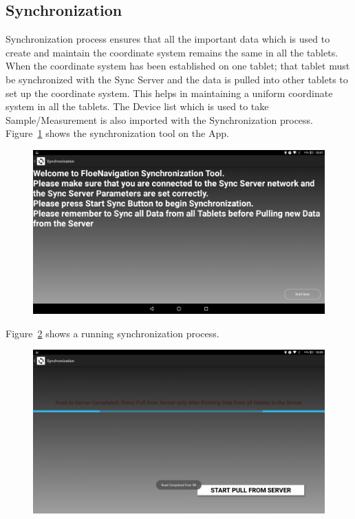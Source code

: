 \subsection{Synchronization}
\label{subsec:subsec7_2_4}
\noindent
Synchronization process ensures that all the important data which is used to create and maintain the coordinate system remains the same in all the tablets. When the coordinate system has been established on one tablet; that tablet must be synchronized with the Sync Server and the data is pulled into other tablets to set up the coordinate system. This helps in maintaining a uniform coordinate system in all the tablets. The Device list which is used to take Sample/Measurement is also imported with the Synchronization process. Figure~\ref{fig:CH7SyncScreen} shows the synchronization tool on the App. 
\begin{figure}[h]
	\centering
	\includegraphics[height=0.3\textheight]{fig07/SyncScreen.png}
	\label{fig:CH7SyncScreen}
\end{figure}
Figure~\ref{fig:CH7SyncInProgress} shows a running synchronization process. 
\begin{figure}[h]
	\centering
	\includegraphics[height=0.3\textheight]{fig07/SyncInProgress.png}
	\label{fig:CH7SyncInProgress}
\end{figure}
%
\newpage
